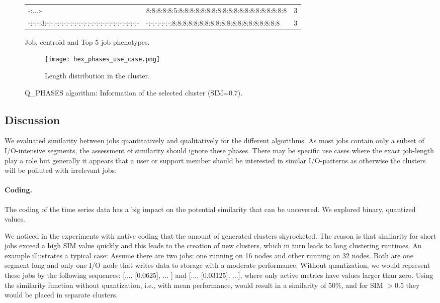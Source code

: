 \documentclass{jhps}
\begin{document}
\begin{figure}
\begin{subtable}{\textwidth}
\begin{tiny}
\begin{tabular}{ll|r}
       -:...:-                                             &  8:8:8:8:8:5:8:8:8:8:8:8:8:8:8:8:8:8:8:8:8:8:8:8:8:8   & 3        \\ 
       -:-:-:3:-:-:-:-:-:-:-:-:-:-:-:-:-:-:-:-:-:-:-:-:-:- &  -:-:-:-:-:-:8:8:8:8:8:8:8:8:8:8:8:8:8:8:8:8:8:8:8:8   & 3        \\ 
      \end{tabular}
		\end{tiny}
		\caption{Job, centroid and Top 5 job phenotypes.}
		\label{cluster:use_case:pm_quant:top_jobs}
	\end{subtable}
	\medskip
	\begin{subfigure}{\textwidth}
		\centering
    \texttt{[image: hex\_phases\_use\_case.png]}
		\caption{Length distribution in the cluster.}
		\label{cluster:use_case:pm_quant:length}
	\end{subfigure}
	\caption{Q\_PHASES algorithm: Information of the selected cluster (SIM=0.7).}
	\label{cluster:use_case:pm_quant}
\end{figure}


\FloatBarrier
\subsection{Discussion}
We evaluated similarity between jobs quantitatively and qualitatively for the different algorithms.
As most jobs contain only a subset of I/O-intensive segments, the assessment of similarity should ignore these phases.
There may be specific use cases where the exact job-length play a role but generally it appears that a user or support member should be interested in similar I/O-patterns as otherwise the clusters will be polluted with  irrelevant jobs.

\paragraph{Coding.} The coding of the time series data has a big impact on the potential similarity that can be uncovered.
We explored binary, quantized values.

We noticed in the experiments with native coding that the amount of generated clusters skyrocketed.
The reason is that similarity for short jobs exceed a high SIM value quickly and this leads to the creation of new clusters, which in turn leads to long clustering runtimes.
An example illustrates a typical case:
Assume there are two jobs: one running on 16 nodes and other running on 32 nodes.
Both are one segment long and only one I/O node that writes data to storage with a moderate performance.
Without quantization, we would represent these jobs by the following sequences:  [..., [0.0625], $ \ldots $ ] and [..., [0.03125], ...], where only active metrics have values larger than zero.
Using the similarity function without quantization, i.e., with mean performance, would result in a similarity of 50$\%$, and for SIM $>0.5$ they would be placed in separate clusters.
\end{document}
